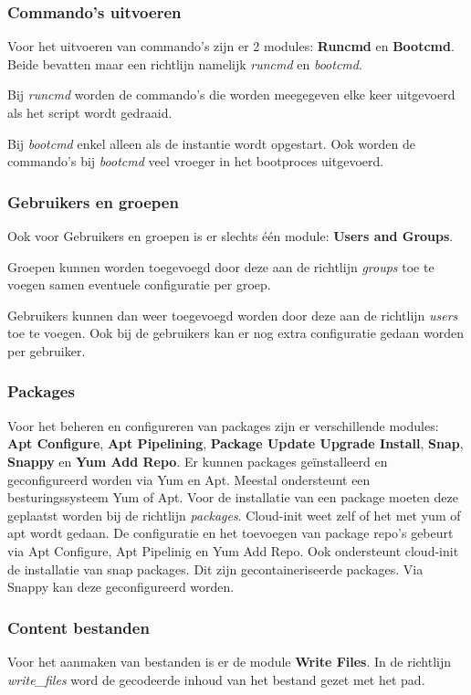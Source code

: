 \subsubsection{Commando's uitvoeren}
Voor het uitvoeren van commando's zijn er 2 modules: \textbf{Runcmd} en \textbf{Bootcmd}. Beide bevatten maar een richtlijn namelijk \textit{runcmd} en \textit{bootcmd}. 

Bij \textit{runcmd} worden de commando's die worden meegegeven elke keer uitgevoerd als het script wordt gedraaid. 

Bij \textit{bootcmd} enkel alleen als de instantie wordt opgestart. Ook worden de commando's bij \textit{bootcmd} veel vroeger in het bootproces uitgevoerd.

\subsubsection{Gebruikers en groepen}
Ook voor Gebruikers en groepen is er slechts één module: \textbf{Users and Groups}. 

Groepen kunnen worden toegevoegd door deze aan de richtlijn \textit{groups} toe te voegen samen eventuele configuratie per groep. 

Gebruikers kunnen dan weer toegevoegd worden door deze aan de richtlijn \textit{users} toe te voegen. Ook bij de gebruikers kan er nog extra configuratie gedaan worden per gebruiker.

\newpage
\subsubsection{Packages}
Voor het beheren en configureren van packages zijn er verschillende modules: \textbf{Apt Configure}, \textbf{Apt Pipelining}, \textbf{Package Update Upgrade Install}, \textbf{Snap}, \textbf{Snappy} en \textbf{Yum Add Repo}. Er kunnen packages geïnstalleerd en geconfigureerd worden via Yum en Apt. Meestal ondersteunt een besturingssysteem Yum of Apt. Voor de installatie van een package moeten deze geplaatst worden bij de richtlijn \textit{packages}. Cloud-init weet zelf of het met yum of apt wordt gedaan. De configuratie en het toevoegen van package repo's gebeurt via Apt Configure, Apt Pipelinig en Yum Add Repo. Ook ondersteunt cloud-init de installatie van snap packages. Dit zijn gecontaineriseerde packages. Via Snappy kan deze geconfigureerd worden.

\subsubsection{Content bestanden}
Voor het aanmaken van bestanden is er de module \textbf{Write Files}. In de richtlijn \textit{write\_files} word de gecodeerde inhoud van het bestand gezet met het pad.

